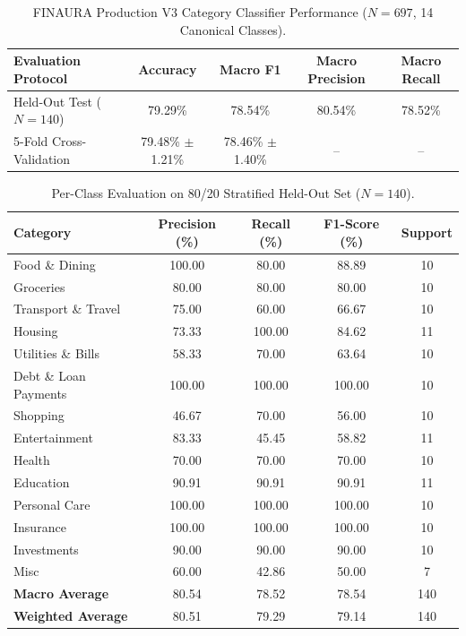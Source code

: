 
\begin{table}[t]
\centering
\caption{FINAURA Production V3 Category Classifier Performance ($N=697$, 14 Canonical Classes).}
\label{tab:v3_category_overall}
\begin{tabular}{lcccc}
\hline
\textbf{Evaluation Protocol} & \textbf{Accuracy} & \textbf{Macro F1} & \textbf{Macro Precision} & \textbf{Macro Recall} \\
\hline
Held-Out Test ($N=140$) & 79.29\% & 78.54\% & 80.54\% & 78.52\% \\
5-Fold Cross-Validation & 79.48\% $\pm$ 1.21\% & 78.46\% $\pm$ 1.40\% & -- & -- \\
\hline
\end{tabular}
\end{table}

\begin{table}[t]
\centering
\caption{Per-Class Evaluation on 80/20 Stratified Held-Out Set ($N=140$).}
\label{tab:v3_per_class}
\begin{tabular}{lcccc}
\hline
\textbf{Category} & \textbf{Precision (\%)} & \textbf{Recall (\%)} & \textbf{F1-Score (\%)} & \textbf{Support} \\
\hline
Food \& Dining & 100.00 & 80.00 & 88.89 & 10 \\
Groceries & 80.00 & 80.00 & 80.00 & 10 \\
Transport \& Travel & 75.00 & 60.00 & 66.67 & 10 \\
Housing & 73.33 & 100.00 & 84.62 & 11 \\
Utilities \& Bills & 58.33 & 70.00 & 63.64 & 10 \\
Debt \& Loan Payments & 100.00 & 100.00 & 100.00 & 10 \\
Shopping & 46.67 & 70.00 & 56.00 & 10 \\
Entertainment & 83.33 & 45.45 & 58.82 & 11 \\
Health & 70.00 & 70.00 & 70.00 & 10 \\
Education & 90.91 & 90.91 & 90.91 & 11 \\
Personal Care & 100.00 & 100.00 & 100.00 & 10 \\
Insurance & 100.00 & 100.00 & 100.00 & 10 \\
Investments & 90.00 & 90.00 & 90.00 & 10 \\
Misc & 60.00 & 42.86 & 50.00 & 7 \\
\hline
\textbf{Macro Average} & 80.54 & 78.52 & 78.54 & 140 \\
\textbf{Weighted Average} & 80.51 & 79.29 & 79.14 & 140 \\
\hline
\end{tabular}
\end{table}

